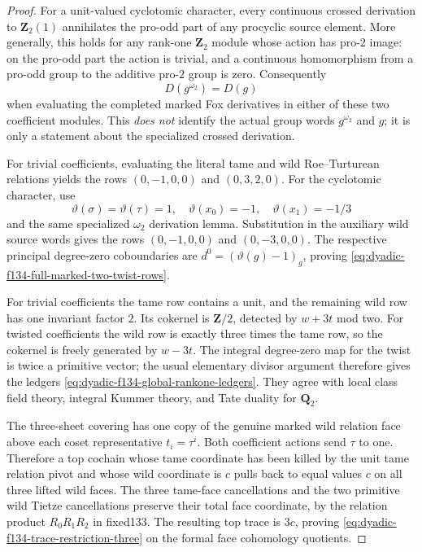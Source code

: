 \begin{proof}
For a unit-valued
cyclotomic character,
every continuous
crossed derivation
to $\mathbf Z_2(1)$
annihilates the
pro-odd part of
any procyclic
source element.
More generally,
this holds for
any rank-one
$\mathbf Z_2$
module whose
action has
pro-$2$ image:
on the pro-odd
part the action
is trivial,
and a continuous
homomorphism
from a pro-odd
group to the
additive pro-$2$
group is zero.
Consequently
\begin{equation}\label{eq:dyadic-f134-omega2-crossed-derivation}
\boxed{\qquad
D(g^{\omega_2})=D(g)
\qquad}
\end{equation}
when evaluating
the completed
marked Fox
derivatives in
either of these
two coefficient
modules.
This \emph{does
not} identify
the actual
group words
$g^{\omega_2}$
and $g$;
it is only
a statement
about the
specialized
crossed derivation.

For trivial
coefficients,
evaluating the
literal tame
and wild
Roe--Turturean
relations yields
the rows
$(0,-1,0,0)$
and $(0,3,2,0)$.
For the
cyclotomic
character, use
\[
\vartheta(\sigma)
=\vartheta(\tau)=1,\quad
\vartheta(x_0)=-1,\quad
\vartheta(x_1)=-1/3
\]
and the same
specialized
$\omega_2$
derivation lemma.
Substitution in
the auxiliary
wild source words
gives the rows
$(0,-1,0,0)$
and $(0,-3,0,0)$.
The respective
principal degree-zero
coboundaries
are
$d^0=(\vartheta(g)-1)_g$,
proving
\eqref{eq:dyadic-f134-full-marked-two-twist-rows}.

For trivial
coefficients
the tame row
contains a unit,
and the
remaining wild
row has one
invariant factor
$2$.  Its
cokernel is
$\mathbf Z/2$,
detected by
$w+3t$ mod two.
For twisted
coefficients
the wild row
is exactly
three times
the tame row,
so the cokernel
is freely
generated by
$w-3t$.
The integral
degree-zero
map for the
twist is twice
a primitive
vector; the
usual elementary
divisor argument
therefore gives
the ledgers
\eqref{eq:dyadic-f134-global-rankone-ledgers}.
They agree with
local class
field theory,
integral Kummer
theory, and Tate
duality for
$\mathbf Q_2$.

The three-sheet
covering has
one copy of
the genuine
marked wild
relation face
above each
coset representative
$t_i=\tau^i$.
Both coefficient
actions send
$\tau$ to one.
Therefore a
top cochain
whose tame
coordinate
has been killed
by the unit
tame relation
pivot and whose
wild coordinate
is $c$ pulls
back to equal
values $c$
on all three
lifted wild
faces.
The three
tame-face
cancellations
and the two
primitive wild
Tietze
cancellations
preserve their
total face
coordinate,
by the relation
product
$R_0R_1R_2$
in fixed133.
The resulting
top trace is
$3c$, proving
\eqref{eq:dyadic-f134-trace-restriction-three}
on the formal
face cohomology
quotients.


\end{proof}
